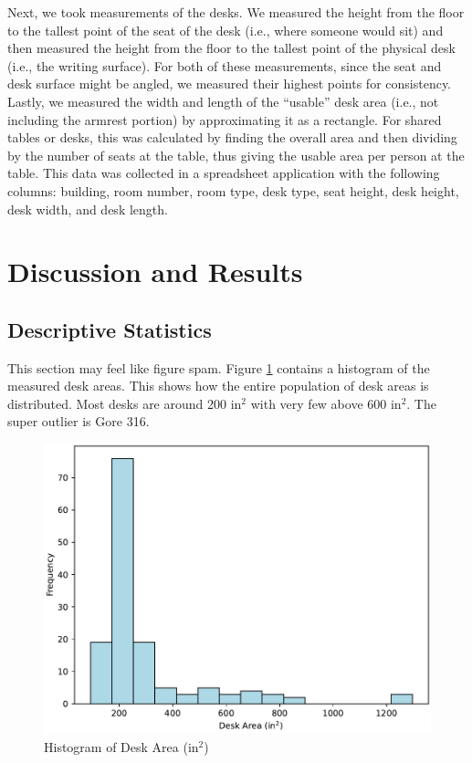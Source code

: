 \documentclass[conference]{IEEEtran}
\begin{document}
Next, we took measurements of the desks. We measured the height from the floor to the tallest point of the seat of the desk (i.e., where someone would sit) and then measured the height from the floor to the tallest point of the physical desk (i.e., the writing surface). For both of these measurements, since the seat and desk surface might be angled, we measured their highest points for consistency. Lastly, we measured the width and length of the “usable” desk area (i.e., not including the armrest portion) by approximating it as a rectangle. For shared tables or desks, this was calculated by finding the overall area and then dividing by the number of seats at the table, thus giving the usable area per person at the table. This data was collected in a spreadsheet application with the following columns: building, room number, room type, desk type, seat height, desk height, desk width, and desk length.




\section{Discussion and Results}
\subsection{Descriptive Statistics}

This section may feel like figure spam. Figure \ref*{fig:hist} contains a histogram of the measured desk areas. This shows how the entire population of desk areas is distributed. Most desks are around 200 in$^2$ with very few above 600 in$^2$. The super outlier is Gore 316.

\begin{figure}[H]
    \includegraphics[width=\linewidth]{vis/hist.pdf}
    \caption{Histogram of Desk Area (in$^2$)}
    \label{fig:hist}
\end{figure}
\end{document}
